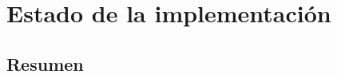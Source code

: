 \chapter[Estado de la implementación]{Estado de la implementación}
\label{cp:estado-implementacion}

\section*{Resumen}
